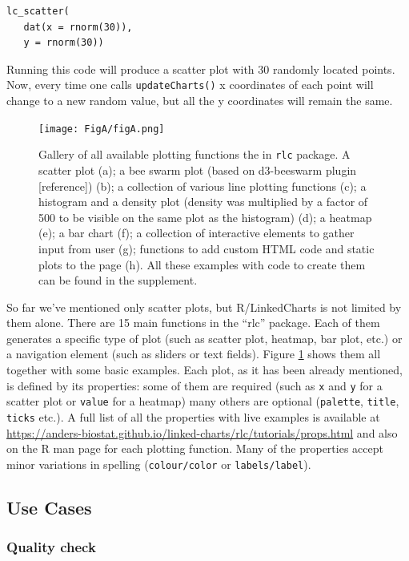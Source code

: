 \documentclass[twocolumn,10pt]{article}
\begin{document}
\begin{verbatim}
lc_scatter(
   dat(x = rnorm(30)),
   y = rnorm(30))
\end{verbatim}

Running this code will produce a scatter plot with 30 randomly located points. Now, every time one calls \texttt{updateCharts()} x coordinates of each point will change to a new random value, but all the y coordinates will remain the same.

\begin{figure}
	\texttt{[image: FigA/figA.png]}
	\caption{Gallery of all available plotting functions the in \texttt{rlc} package. A scatter plot (a); a bee swarm plot (based on d3-beeswarm plugin [reference]) (b); a collection of various line plotting functions (c); a histogram and a density plot (density was multiplied by a factor of 500 to be visible on the same plot as the histogram) (d); a heatmap (e); a bar chart (f); a collection of interactive elements to gather input from user (g); functions to add custom HTML code and static plots to the page (h). All these examples with code to create them can be found in the supplement.}
	\label{FigA}
\end{figure}

So far we've mentioned only scatter plots, but R/LinkedCharts is not limited by them alone. There are 15 main functions in the ``rlc'' package. Each of them generates a specific type of plot (such as scatter plot, heatmap, bar plot, etc.) or a navigation element (such as sliders or text fields). Figure \ref{FigA} shows them all together with some basic examples. Each plot, as it has been already mentioned, is defined by its properties: some of them are required (such as \texttt{x} and \texttt{y} for a scatter plot or \texttt{value} for a heatmap) many others are optional (\texttt{palette}, \texttt{title}, \texttt{ticks} etc.). A full list of all the properties with live examples is available at \url{https://anders-biostat.github.io/linked-charts/rlc/tutorials/props.html} and also on the R man page for each plotting function. Many of the properties accept minor variations in spelling (\texttt{colour/color} or \texttt{labels/label}).

\subsection{Use Cases}
\subsubsection{Quality check}
\end{document}
